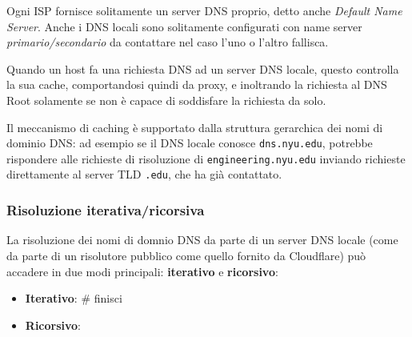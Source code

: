 \documentclass[a4paper,11pt]{article}
\begin{document}
Ogni ISP fornisce solitamente un server DNS proprio, detto anche \textit{Default Name Server}.
Anche i DNS locali sono solitamente configurati con name server \textit{primario/secondario} da contattare nel caso l'uno o l'altro fallisca. 

Quando un host fa una richiesta DNS ad un server DNS locale, questo controlla la sua cache, comportandosi quindi da proxy, e inoltrando la richiesta al DNS Root solamente se non è capace di soddisfare la richiesta da solo.

Il meccanismo di caching è supportato dalla struttura gerarchica dei nomi di dominio DNS: ad esempio se il DNS locale conosce \lstinline|dns.nyu.edu|, potrebbe rispondere alle richieste di risoluzione di \lstinline|engineering.nyu.edu| inviando richieste direttamente al server TLD \lstinline|.edu|, che ha già contattato.

\subsubsection{Risoluzione iterativa/ricorsiva}
La risoluzione dei nomi di domnio DNS da parte di un server DNS locale (come da parte di un risolutore pubblico come quello fornito da Cloudflare) può accadere in due modi principali: \textbf{iterativo} e \textbf{ricorsivo}:
\begin{itemize}
	\item \textbf{Iterativo}: # finisci
	\item \textbf{Ricorsivo}:
\end{itemize}
\end{document}
